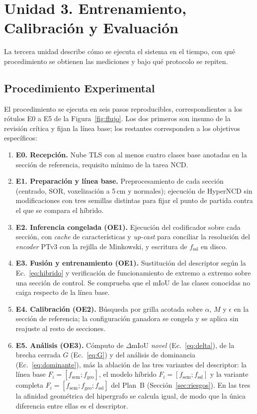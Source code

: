 \FloatBarrier
\section{Unidad 3. Entrenamiento, Calibración y Evaluación}
\label{sec:unidad3}

La tercera unidad describe cómo se ejecuta el sistema en el tiempo, con qué
procedimiento se obtienen las mediciones y bajo qué protocolo se repiten.

\FloatBarrier
\subsection{Procedimiento Experimental}
\label{sec:procedimiento}

El procedimiento se ejecuta en seis pasos reproducibles, correspondientes a los
rótulos E0 a E5 de la Figura~\ref{fig:flujo}. Los dos primeros son insumo de la
revisión crítica y fijan la línea base; los restantes corresponden a los
objetivos específicos:

\begin{enumerate}\setlength{\itemsep}{2pt}
\item \textbf{E0. Recepción.} Nube TLS con al menos cuatro clases base anotadas
en la sección de referencia, requisito mínimo de la tarea NCD.
\item \textbf{E1. Preparación y línea base.} Preprocesamiento de cada sección
(centrado, SOR, voxelización a 5\,cm y normales); ejecución de HyperNCD sin
modificaciones con tres semillas distintas para fijar el punto de partida contra
el que se compara el híbrido.
\item \textbf{E2. Inferencia congelada (OE1).} Ejecución del codificador sobre
cada sección, con \emph{cache} de características y \emph{up-cast} para
conciliar la resolución del \emph{encoder} PTv3 con la rejilla de Minkowski, y
escritura de $f_{\mathrm{ssl}}$ en disco.
\item \textbf{E3. Fusión y entrenamiento (OE1).} Sustitución del descriptor
según la Ec.~\eqref{eq:hibrido} y verificación de funcionamiento de extremo a
extremo sobre una sección de control. Se comprueba que el mIoU de las clases
conocidas no caiga respecto de la línea base.
\item \textbf{E4. Calibración (OE2).} Búsqueda por grilla acotada sobre
$\alpha$, $M$ y $\epsilon$ en la sección de referencia; la configuración
ganadora se congela y se aplica sin reajuste al resto de secciones.
\item \textbf{E5. Análisis (OE3).} Cómputo de $\Delta$mIoU \emph{novel}
(Ec.~\eqref{eq:delta}), de la brecha cerrada $G$ (Ec.~\eqref{eq:G}) y del
análisis de dominancia (Ec.~\eqref{eq:dominante}), más la ablación de las tres
variantes del descriptor: la línea base
$F_i=[f_{\mathrm{sem}};f_{\mathrm{geo}}]$, el modelo híbrido
$F_i=[f_{\mathrm{sem}};f_{\mathrm{ssl}}]$ y la variante completa
$F_i=[f_{\mathrm{sem}};f_{\mathrm{geo}};f_{\mathrm{ssl}}]$ del Plan~B
(Sección~\ref{sec:riesgos}). En las tres la afinidad geométrica del hipergrafo
se calcula igual, de modo que la única diferencia entre ellas es el descriptor.
\end{enumerate}


